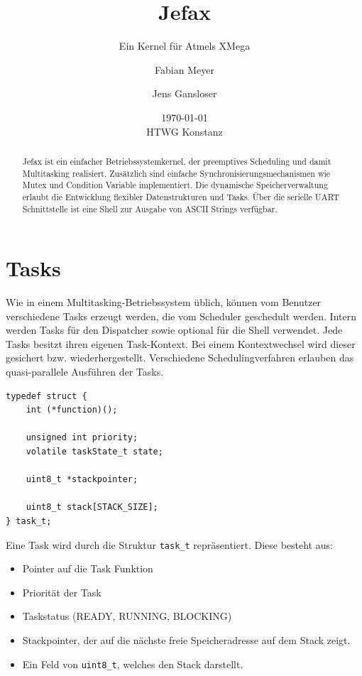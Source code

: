 \documentclass[fontsize=12pt, toc=bibliography, notitlepage]{scrreprt}
\title{Jefax}
\subtitle{Ein Kernel für Atmels XMega}
\author{Fabian Meyer \and Jens Gansloser}
\date{\today \\ HTWG Konstanz}
\begin{document}
\maketitle

\begin{abstract}
Jefax ist ein einfacher Betriebssystemkernel, der preemptives Scheduling und damit Multitasking realisiert. Zusätzlich sind einfache Synchronisierungsmechanismen wie Mutex und Condition Variable implementiert. Die dynamische Speicherverwaltung erlaubt die Entwicklung flexibler Datenstrukturen und Tasks. Über die serielle UART Schnittstelle ist eine Shell zur Ausgabe von ASCII Strings verfügbar.
\end{abstract}
\clearpage

\tableofcontents

\chapter{Tasks}
\label{chap:tasks}
Wie in einem Multitasking-Betriebssystem üblich, können vom Benutzer verschiedene Tasks erzeugt werden, die vom Scheduler geschedult werden. Intern werden Tasks für den Dispatcher sowie optional für die Shell verwendet. Jede Tasks besitzt ihren eigenen Task-Kontext. Bei einem Kontextwechsel wird dieser gesichert bzw. wiederhergestellt. Verschiedene Schedulingverfahren erlauben das quasi-parallele Ausführen der Tasks.\\

\begin{lstlisting}[title=task.h]
typedef struct {
	int (*function)();

	unsigned int priority;
	volatile taskState_t state;

	uint8_t *stackpointer;

	uint8_t stack[STACK_SIZE];
} task_t;
\end{lstlisting}

Eine Task wird durch die Struktur \lstinline$task_t$ repräsentiert. Diese besteht aus:

\begin{itemize}
\item Pointer auf die Task Funktion
\item Priorität der Task
\item Taskstatus (READY, RUNNING, BLOCKING)
\item Stackpointer, der auf die nächste freie Speicheradresse auf dem Stack zeigt.
\item Ein Feld von \lstinline$uint8_t$, welches den Stack darstellt.
\end{itemize}
\end{document}
